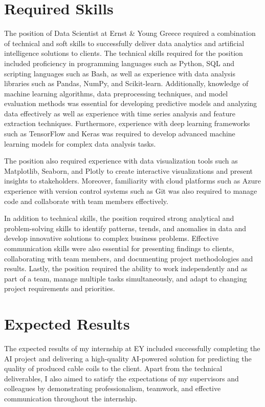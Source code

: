 \section{Required Skills}

The position of Data Scientist at Ernst \& Young Greece required a combination
of technical and soft skills to successfully deliver data analytics and
artificial intelligence solutions to clients. The technical skills required for
the position included proficiency in programming languages such as Python, SQL
and scripting languages such as Bash, as well as experience with data analysis
libraries such as Pandas, NumPy, and Scikit-learn. Additionally, knowledge of
machine learning algorithms, data preprocessing techniques, and model
evaluation methods was essential for developing predictive models and analyzing
data effectively as well as experience with time series analysis and feature
extraction techniques. Furthermore, experience with deep learning frameworks
such as TensorFlow and Keras was required to develop advanced machine learning
models for complex data analysis tasks.

The position also required experience with data visualization tools such as
Matplotlib, Seaborn, and Plotly to create interactive visualizations and
present insights to stakeholders. Moreover, familiarity with cloud platforms
such as Azure experience with version control systems such as Git was also
required to manage code and collaborate with team members effectively.

In addition to technical skills, the position required strong analytical and
problem-solving skills to identify patterns, trends, and anomalies in data and
develop innovative solutions to complex business problems. Effective
communication skills were also essential for presenting findings to clients,
collaborating with team members, and documenting project methodologies and
results. Lastly, the position required the ability to work independently and as
part of a team, manage multiple tasks simultaneously, and adapt to changing
project requirements and priorities.

\section{Expected Results}

The expected results of my internship at EY included successfully completing
the AI project and delivering a high-quality AI-powered solution for predicting
the quality of produced cable coils to the client. Apart from the technical
deliverables, I also aimed to satisfy the expectations of my supervisors and
colleagues by demonstrating professionalism, teamwork, and effective
communication throughout the internship.